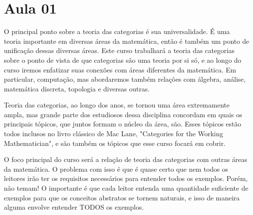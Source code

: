 \section{Aula 01}

O principal ponto sobre a teoria das categorias é sua universalidade. É uma teoria importante em diversas áreas da matemática, então é também um ponto de unificação dessas diversas áreas. Este curso trabalhará a teoria das categorias sobre o ponto de vista de que categorias são uma teoria por si só, e ao longo do curso iremos enfatizar suas conexões com áreas diferentes da matemática. Em particular, computação, mas abordaremos também relações com álgebra, análise, matemática discreta, topologia e diversas outras.

Teoria das categorias, ao longo dos anos, se tornou uma área extremamente ampla, mas grande parte dos estudiosos dessa disciplina concordam em quais os principais tópicos, que juntos formam o núcleo da área, são. Esses tópicos estão todos inclusos no livro clássico de Mac Lane, "Categories for the Working Mathematician", e são também os tópicos que esse curso focará em cobrir.

O foco principal do curso será a relação de teoria das categorias com outras áreas da matemática. O problema com isso é que é quase certo que nem todos os leitores irão ter os requisitos necessários para entender todos os exemplos. Porém, não temam! O importante é que cada leitor entenda uma quantidade suficiente de exemplos para que os conceitos abstratos se tornem naturais, e isso de maneira alguma envolve entender TODOS os exemplos.

